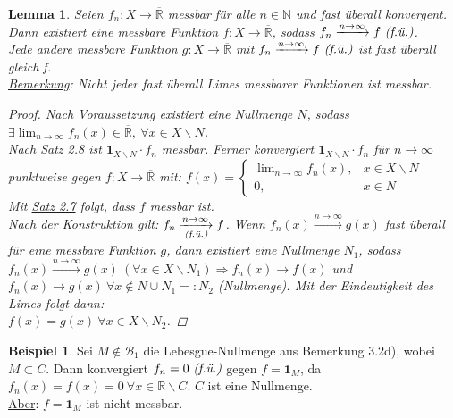 \documentclass[a4paper]{report}
\newcommand{\doubleOne}{\textbf{1}}
\newcommand{\R}{\mathbb{R}}
\newcommand{\Rq}{\overline{\R}}
\newcommand{\N}{\mathbb{N}}
\newcommand{\Borel}{\mathcal{B}}
\newcommand{\toInf}{\rightarrow \infty}
\newcommand{\limToInf}[1]{\lim_{#1 \toInf}}
\newcommand{\jlabel}[1]{\label{j_#1}}
\newcommand{\jhyperref}[2]{\hyperref[j_#1]{#2}}
\newcommand{\jlink}[1]{\jhyperref{#1}{#1}}
\newcommand{\fu}{\text{\textit{(f.ü.)}}}
\newcommand{\jabb}[3]{ #1: #2 \rightarrow #3 }
\theoremstyle{plain}
\newtheorem{lem}[thm]{Lemma}
\theoremstyle{definition}
\newtheorem*{expl*}{Beispiel}
\begin{document}
{{{{\begin{lem}
\jlabel{Lem 3.7}
    Seien $\jabb{f_n}{X}{\Rq}$ messbar für alle $n\in\N$ und fast überall konvergent. Dann existiert eine messbare Funktion $\jabb{f}{X}{\Rq}$, sodass $f_n\xrightarrow{n\rightarrow\infty} f \ \fu$.\\
    Jede andere messbare Funktion $\jabb{g}{X}{\Rq}$ mit $f_n \xrightarrow{n\rightarrow \infty} f \ \fu$ ist fast überall gleich f.\\
    \uline{Bemerkung}: Nicht jeder fast überall Limes messbarer Funktionen ist messbar.
    \begin{proof}
        Nach Voraussetzung existiert eine Nullmenge $N$, sodass\\
        $\exists \limToInf{n} f_n(x)\in\Rq, \ \forall x\in X\backslash N$.\\
        Nach \jlink{Satz 2.8} ist $\doubleOne_{X\backslash N} \cdot f_n$ messbar. Ferner konvergiert $\doubleOne_{X\backslash N}\cdot f_n$ für $n \rightarrow \infty$ punktweise gegen $\jabb{f}{X}{\Rq}$ mit: $f(x) = \begin{cases} \limToInf{n} f_n(x), & x\in X\backslash N\\ 0, & x\in N \end{cases}$\\
        Mit \jlink{Satz 2.7} folgt, dass $f$ messbar ist.\\
        Nach der Konstruktion gilt: $f_n \underset{\fu}{\xrightarrow{n \rightarrow \infty}} f$. Wenn $f_n(x) \xrightarrow{n\rightarrow \infty} g(x)$ fast überall für eine messbare Funktion $g$, dann existiert eine Nullmenge $N_1$, sodass $f_n(x) \xrightarrow{n\rightarrow \infty} g(x) \ (\forall x\in X\backslash N_1) \Rightarrow f_n(x) \rightarrow f(x)$ und $f_n(x) \rightarrow g(x) \ \forall x\notin N\cup N_1 =: N_2$ (Nullmenge). Mit der Eindeutigkeit des Limes folgt dann:\\
        $f(x) = g(x) \ \forall x\in X\backslash N_2$.
    \end{proof}
\end{lem}

\begin{expl*}
    Sei $M\notin \Borel_1$ die Lebesgue-Nullmenge aus Bemerkung 3.2d), wobei $M\subset C$. Dann konvergiert $f_n=0 \ \fu$ gegen $f = \doubleOne_M$, da $f_n(x) = f(x) = 0 \ \forall x \in \R\backslash C$. $C$ ist eine Nullmenge.\\
    \uline{Aber}: $f= \doubleOne_M$ ist nicht messbar.
\end{expl*}

}}}}
\end{document}

